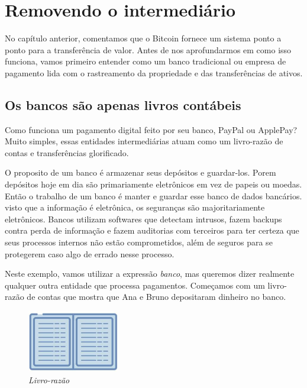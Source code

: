 \chapter{Removendo o intermediário}
\label{ch:capitulo2}

No capítulo anterior, comentamos que o Bitcoin fornece um sistema ponto a ponto para a transferência de valor. Antes de nos aprofundarmos em como isso funciona, vamos primeiro entender como um banco tradicional ou empresa de pagamento lida com o rastreamento da propriedade e das transferências de ativos.

\section*{Os bancos são apenas livros contábeis}

Como funciona um pagamento digital feito por seu banco, PayPal ou ApplePay? Muito simples, essas entidades intermediárias atuam como um livro-razão de contas e transferências glorificado.

O proposito de um banco é armazenar seus depósitos e guardar-los. Porem depósitos hoje em dia são primariamente eletrônicos em vez de papeis ou moedas.
Então o trabalho de um banco é manter e guardar esse banco de dados bancários.
visto que a informação é eletrônica, os seguranças são majoritariamente eletrônicos.
Bancos utilizam softwares que detectam intrusos, fazem backups contra perda de informação e fazem auditorias com terceiros para ter certeza que seus processos internos não estão comprometidos, além de seguros para se protegerem caso algo de errado nesse processo.

Neste exemplo, vamos utilizar a expressão \textit{banco}, mas queremos dizer realmente qualquer outra entidade que processa pagamentos. Começamos com um livro-razão de contas que mostra que Ana e Bruno depositaram dinheiro no banco.

\begin{figure}
  \centering
  \includegraphics[width=4cm]{imagens/livro-capitulo-02.jpg}  
  \caption*{\textit{\small Livro-razão}}
\end{figure}

